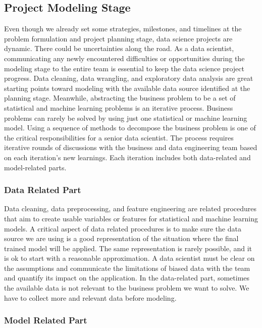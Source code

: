 \documentclass[
  12pt,
]{krantz}
\begin{document}
\hypertarget{project-modeling-stage}{%
\subsection{Project Modeling Stage}\label{project-modeling-stage}}

Even though we already set some strategies, milestones, and timelines at the problem formulation and project planning stage, data science projects are dynamic. There could be uncertainties along the road. As a data scientist, communicating any newly encountered difficulties or opportunities during the modeling stage to the entire team is essential to keep the data science project progress. Data cleaning, data wrangling, and exploratory data analysis are great starting points toward modeling with the available data source identified at the planning stage. Meanwhile, abstracting the business problem to be a set of statistical and machine learning problems is an iterative process. Business problems can rarely be solved by using just one statistical or machine learning model. Using a sequence of methods to decompose the business problem is one of the critical responsibilities for a senior data scientist. The process requires iterative rounds of discussions with the business and data engineering team based on each iteration's new learnings. Each iteration includes both data-related and model-related parts.

\hypertarget{data-related-part}{%
\subsubsection{Data Related Part}\label{data-related-part}}

Data cleaning, data preprocessing, and feature engineering are related procedures that aim to create usable variables or features for statistical and machine learning models. A critical aspect of data related procedures is to make sure the data source we are using is a good representation of the situation where the final trained model will be applied. The same representation is rarely possible, and it is ok to start with a reasonable approximation. A data scientist must be clear on the assumptions and communicate the limitations of biased data with the team and quantify its impact on the application. In the data-related part, sometimes the available data is not relevant to the business problem we want to solve. We have to collect more and relevant data before modeling.

\hypertarget{model-related-part}{%
\subsubsection{Model Related Part}\label{model-related-part}}
\end{document}
